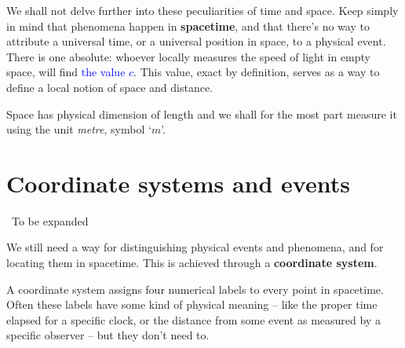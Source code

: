 \documentclass[a4paper,12pt,%
onecolumn,oneside,%
british%
]{memoir}
\newcommand{\mynotew}[1]{{\footnotesize\color{midgrey}\faIcon{tools}\ #1}}
\renewcommand*{\|}[1][]{\nonscript\:#1\vert\nonscript\:\mathopen{}}
\newcommand*{\sect}{\S}%
\renewcommand*{\autoref}[2]{\sidepar{\vspace{-1ex}\footnotesize{\color{blue}\faIcon{%
angle-right%
}\enspace\sect\,\ref{#1} page\,\pageref{#1}}}\textcolor{blue}{#2}}
\newcommand*{\yc}{c} %
\begin{document}
\smallskip

We shall not delve further into these peculiarities of time and space. Keep simply in mind that phenomena happen in \textbf{spacetime}, and that there's no way to attribute a universal time, or a universal position in space, to a physical event. There is one absolute: whoever locally measures the speed of light in empty space, will find \autoref{eq:c}{the value $\yc$}. This value, exact by definition, serves as a way to define a local notion of space and distance.

\smallskip

Space has physical dimension of \textsf{length} and we shall for the most part measure it using the unit \emph{metre}, symbol \enquote*{$\unit{m}$}.




\section{Coordinate systems and events}
\label{sec:coords}

\mynotew{To be expanded}

We still need a way for distinguishing physical events and phenomena, and for locating them in spacetime. This is achieved through a \textbf{coordinate system}.

A coordinate system assigns four numerical labels to every point in spacetime.
%
%
Often these labels have some kind of physical meaning -- like the proper time elapsed for a specific clock, or the distance from some event as measured by a specific observer -- but they don't need to.
\end{document}
